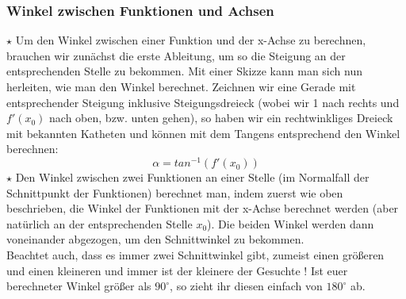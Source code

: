 \subsubsection{Winkel zwischen Funktionen und Achsen}
\(\star\) Um den Winkel zwischen einer Funktion und der x-Achse zu berechnen, brauchen wir zunächst die erste Ableitung, um so die Steigung an der entsprechenden Stelle zu bekommen. Mit einer Skizze kann man sich nun herleiten, wie man den Winkel berechnet. Zeichnen wir eine Gerade mit entsprechender Steigung inklusive Steigungsdreieck (wobei wir 1 nach rechts und \(f'(x_0)\) nach oben, bzw. unten gehen), so haben wir ein rechtwinkliges Dreieck mit bekannten Katheten und können mit dem Tangens entsprechend den Winkel berechnen:
\[\alpha = tan^{-1}(f'(x_0))\]
\(\star\) Den Winkel zwischen zwei Funktionen an einer Stelle (im Normalfall der Schnittpunkt der Funktionen) berechnet man, indem zuerst wie oben beschrieben, die Winkel der Funktionen mit der x-Achse berechnet werden (aber natürlich an der entsprechenden Stelle \(x_0\)). Die beiden Winkel werden dann voneinander abgezogen, um den Schnittwinkel zu bekommen.\\
Beachtet auch, dass es immer zwei Schnittwinkel gibt, zumeist einen größeren und einen kleineren und immer ist  der kleinere der Gesuchte ! Ist euer berechneter Winkel größer als \(90^\circ\), so zieht ihr diesen einfach von \(180^\circ\) ab.
